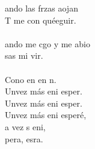 \begin{cancion}%
	ando las frzas aojan\\
	T me con quéeguir. \\
	\jump\\
	ando me cgo y me abio \\
	 sas mi vir. \\
	\jump\\
	Cono en en n. \\
	Unvez más eni esper.\\
	Unvez más eni esper.\\
	Unvez más eni esperé,\\
	a vez s eni, \\
	 pera,  esra.  \\
\end{cancion}%
